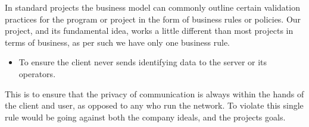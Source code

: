 In standard projects the business model can commonly outline certain validation 
practices for the program or project in the form of business rules or policies. 
Our project, and its fundamental idea, works a little different than most 
projects in terms of business, as per such we have only one business rule.

\begin{itemize}
\item To ensure the client never sends identifying data to the server or its 
operators.
\end{itemize}

This is to ensure that the privacy of communication is always within the hands 
of the client and user, as opposed to any who run the network. To violate this 
single rule would be going against both the company ideals, and the projects 
goals.
